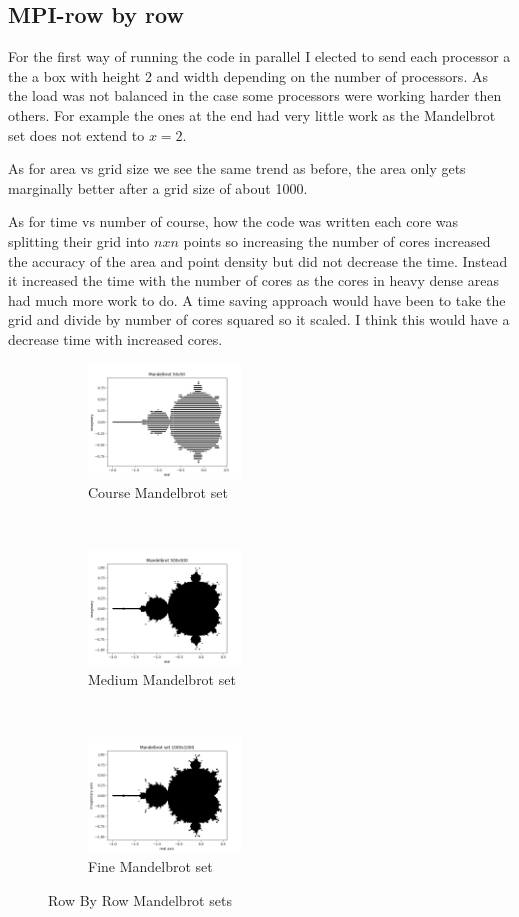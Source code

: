 \documentclass[12pt]{article}
\theoremstyle{plain}
\theoremstyle{definition}
\begin{document}
\subsection*{MPI-row by row}

For the first way of running the code in parallel I elected to send each processor a the a box with height 2 and width depending on the number of processors. As the load was not balanced in the case some processors were working harder then others. For example the ones at the end had very little work as the Mandelbrot set does not extend to $x=2$.

As for area vs grid size we see the same trend as before, the area only gets marginally better after a grid size of about 1000.

As for time vs number of course, how the code was written each core was splitting their grid into $nxn$ points so increasing the number of cores increased the accuracy of the area and point density but did not decrease the time. Instead it increased the time with the number of cores as the cores in heavy dense areas had much more work to do. A time saving approach would have been to take the grid and divide by number of cores squared so it scaled. I think this would have a decrease time with increased cores.
\begin{figure}[t!]
    \centering
    \begin{subfigure}[t]{0.5\textwidth}
        \centering
        \includegraphics[height=1.2in]{mandelbrot_course_b.png}
        \caption{Course Mandelbrot set}
    \end{subfigure}%
    ~
    \begin{subfigure}[t]{0.5\textwidth}
        \centering
        \includegraphics[height=1.2in]{mandelbrot_medium_b.png}
        \caption{Medium Mandelbrot set}
    \end{subfigure}
    ~
        \begin{subfigure}[t]{0.5\textwidth}
        \centering
        \includegraphics[height=1.2in]{mandelbrot_fine_b.png}
        \caption{Fine Mandelbrot set}
    \end{subfigure}%
    \caption{Row By Row Mandelbrot sets}
\end{figure}
\end{document}
